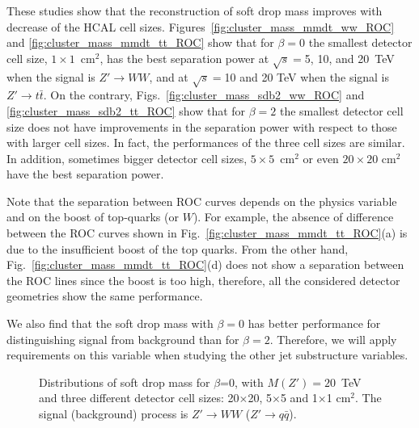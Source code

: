 These studies show that the reconstruction of soft drop mass improves with decrease of the HCAL cell sizes.
Figures~\ref{fig:cluster_mass_mmdt_ww_ROC} and 
\ref{fig:cluster_mass_mmdt_tt_ROC} show that for $\beta=0$ the 
smallest detector cell size, 
$1\times1$~cm$^2$, has the best separation power at 
$\sqrt{s}=$5, 10, and 20~TeV when the signal is $Z' \rightarrow WW$,  and 
at  $\sqrt{s}=$10 and 20 TeV when the signal is $Z' \rightarrow t\bar{t}$.
On the contrary, Figs.~\ref{fig:cluster_mass_sdb2_ww_ROC} and \ref{fig:cluster_mass_sdb2_tt_ROC} 
show that for $\beta=2$ the smallest detector cell size 
does not have improvements in the separation power with respect to those with 
larger cell sizes. In fact, the performances of the three cell sizes are 
similar. In addition, sometimes bigger detector cell sizes, 
$5\times5$~cm$^2$ or even $20 \times 20$ cm$^2$ have the best separation power. 

Note that the separation between ROC curves depends 
on the physics variable and on the boost of top-quarks (or $W$). For example, 
the absence of difference between the ROC curves shown in Fig.~\ref{fig:cluster_mass_mmdt_tt_ROC}(a)
is due to the insufficient boost of the top quarks.
From the other hand, Fig.~\ref{fig:cluster_mass_mmdt_tt_ROC}(d) does not show a separation
between the ROC lines since the boost is too high, therefore, all the considered 
detector geometries show the same performance.

We also find that the  soft drop mass with $\beta=0$ has better 
performance for distinguishing signal from background than for  $\beta=2$. Therefore, we will 
apply requirements on this variable when studying the other jet substructure 
variables. 
 
\begin{figure}
\begin{center}
\end{center}
\caption{Distributions of soft drop mass for $\beta$=0, with $M(Z') = 20$~TeV and three different detector cell sizes: 20$\times$20, 
5$\times$5 and 1$\times$1 cm$^2$. The signal (background) process is 
$Z' \rightarrow WW$ ($Z'\rightarrow q\bar{q}$).
\label{fig:cluster_mass_mmdt_ww}}
\end{figure}


